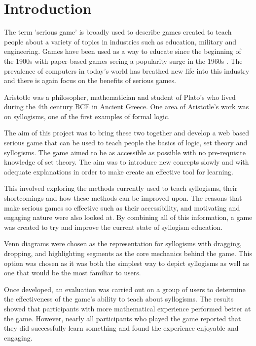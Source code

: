 \documentclass[12pt,a4paper]{report}
\begin{document}
\cleardoublepage

\tableofcontents

\cleardoublepage
{}

\chapter{Introduction}
The term 'serious game' is broadly used to describe games created to teach people about a variety of topics in industries such as education, military and engineering. Games have been used as a way to educate since the beginning of the 1900s with paper-based games seeing a popularity surge in the 1960s \citep{rice2007assessing}. The prevalence of computers in today's world has breathed new life into this industry and there is again focus on the benefits of serious games.

Aristotle was a philosopher, mathematician and student of Plato's who lived during the 4th century BCE in Ancient Greece. One area of Aristotle's work was on syllogisms, one of the first examples of formal logic.

The aim of this project was to bring these two together and develop a web based serious game that can be used to teach people the basics of logic, set theory and syllogisms. The game aimed to be as accessible as possible with no pre-requisite knowledge of set theory. The aim was to introduce new concepts slowly and with adequate explanations in order to make create an effective tool for learning.

This involved exploring the methods currently used to teach syllogisms, their shortcomings and how these methods can be improved upon. The reasons that make serious games so effective such as their accessibility, and motivating and engaging nature were also looked at. By combining all of this information, a game was created to try and improve the current state of syllogism education.

Venn diagrams were chosen as the representation for syllogisms with dragging, dropping, and highlighting segments as the core mechanics behind the game. This option was chosen as it was both the simplest way to depict syllogisms as well as one that would be the most familiar to users.

Once developed, an evaluation was carried out on a group of users to determine the effectiveness of the game's ability to teach about syllogisms. The results showed that participants with more mathematical experience performed better at the game. However, nearly all participants who played the game reported that they did successfully learn something and found the experience enjoyable and engaging. 
\end{document}
